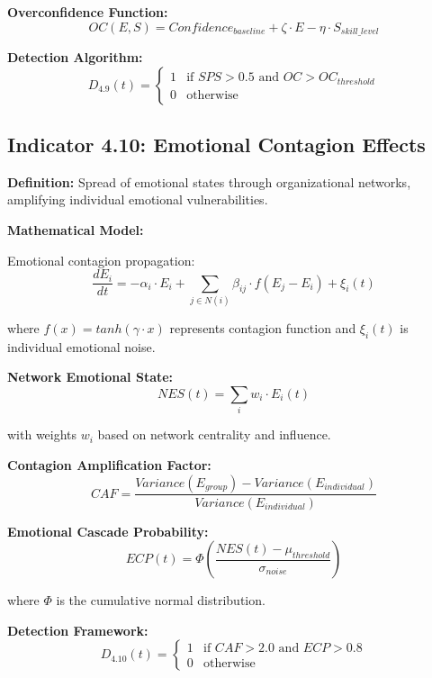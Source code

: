 \documentclass[11pt,a4paper]{article}
\begin{document}
\textbf{Overconfidence Function:}
\begin{equation}
OC(E,S) = Confidence_{baseline} + \zeta \cdot E - \eta \cdot S_{skill\_level}
\end{equation}

\textbf{Detection Algorithm:}
\begin{equation}
D_{4.9}(t) = \begin{cases}
1 & \text{if } SPS > 0.5 \text{ and } OC > OC_{threshold} \\
0 & \text{otherwise}
\end{cases}
\end{equation}

\subsection{Indicator 4.10: Emotional Contagion Effects}

\textbf{Definition:} Spread of emotional states through organizational networks, amplifying individual emotional vulnerabilities.

\textbf{Mathematical Model:}

Emotional contagion propagation:
\begin{equation}
\frac{dE_i}{dt} = -\alpha_i \cdot E_i + \sum_{j \in N(i)} \beta_{ij} \cdot f(E_j - E_i) + \xi_i(t)
\end{equation}

where $f(x) = tanh(\gamma \cdot x)$ represents contagion function and $\xi_i(t)$ is individual emotional noise.

\textbf{Network Emotional State:}
\begin{equation}
NES(t) = \sum_{i} w_i \cdot E_i(t)
\end{equation}

with weights $w_i$ based on network centrality and influence.

\textbf{Contagion Amplification Factor:}
\begin{equation}
CAF = \frac{Variance(E_{group}) - Variance(E_{individual})}{Variance(E_{individual})}
\end{equation}

\textbf{Emotional Cascade Probability:}
\begin{equation}
ECP(t) = \Phi\left(\frac{NES(t) - \mu_{threshold}}{\sigma_{noise}}\right)
\end{equation}

where $\Phi$ is the cumulative normal distribution.

\textbf{Detection Framework:}
\begin{equation}
D_{4.10}(t) = \begin{cases}
1 & \text{if } CAF > 2.0 \text{ and } ECP > 0.8 \\
0 & \text{otherwise}
\end{cases}
\end{equation}
\end{document}
